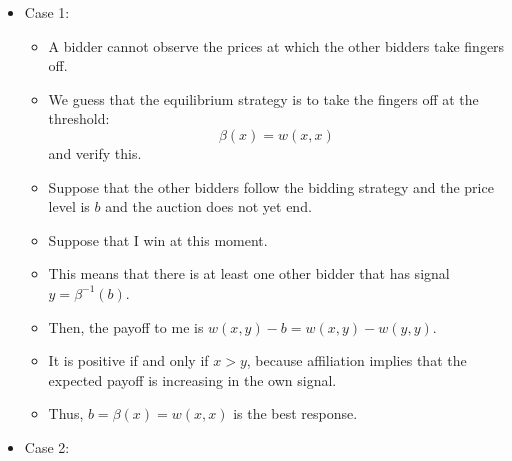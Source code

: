 \documentclass[
]{book}
\providecommand{\tightlist}{%
  \setlength{\itemsep}{0pt}\setlength{\parskip}{0pt}}
\begin{document}
\begin{itemize}
\tightlist
\item
  Case 1:

  \begin{itemize}
  \tightlist
  \item
    A bidder cannot observe the prices at which the other bidders take fingers off.
  \item
    We guess that the equilibrium strategy is to take the fingers off at the threshold:
    \[
      \beta(x) = w(x, x)
      \]
    and verify this.
  \item
    Suppose that the other bidders follow the bidding strategy and the price level is \(b\) and the auction does not yet end.
  \item
    Suppose that I win at this moment.
  \item
    This means that there is at least one other bidder that has signal \(y = \beta^{-1}(b)\).
  \item
    Then, the payoff to me is \(w(x, y) - b = w(x, y) - w(y, y)\).
  \item
    It is positive if and only if \(x > y\), because affiliation implies that the expected payoff is increasing in the own signal.
  \item
    Thus, \(b = \beta(x) = w(x, x)\) is the best response.
  \end{itemize}
\item
  Case 2:


\end{itemize}
\end{document}
